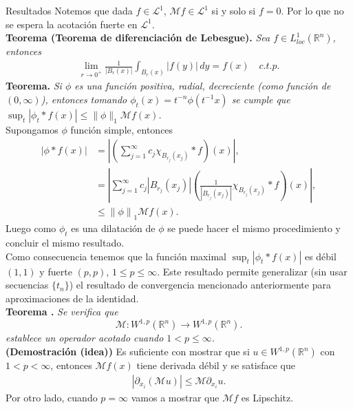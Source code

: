 \documentclass[final]{beamer}
\providecommand{\norm}[1]{\left\|#1\right\|}
\newlength{\colwidth}
\begin{document}
\begin{frame}[t]
\begin{columns}[t]
\begin{column}{\colwidth}
\begin{alertblock}{Resultados}
      \vspace{0.2cm}
      Notemos que dada $f\in \mathcal{L}^1$, $\mathcal{M}f \in \mathcal{L}^1$ si y solo si $f=0$. Por lo que no se espera la acotación fuerte en $\mathcal{L}^1$.\\
      \vspace{0.2cm}
    \textbf{Teorema (Teorema de diferenciación de Lebesgue).} \emph{Sea $f\in L^{1}_{loc}(\mathbb{R}^{n})$, entonces
      \begin{align*}
        \lim_{r \to 0^{+}}\frac{1}{|B_{r}(x)|}\int_{B_{r}(x)}|f(y)|\, dy=f(x)\quad c.t.p.
      \end{align*}}
      \vspace{0.2cm}
    \textbf{Teorema.} \emph{Si $\phi$ es una función positiva, radial, decreciente (como función de $(0,\infty)$), entonces tomando $\phi_{t}(x)=t^{-n}\phi(t^{-1}x)$ se cumple que $\sup_{t}|\phi_t\ast f(x)|\leq \|\phi\|_1\mathcal{M}f(x)$.}\\
      Supongamos $\phi$ función simple, entonces
      \begin{align*}
        \left|\phi*f(x)\right|&=\left|\left(\sum_{j=1}^{\infty}c_j\chi_{B_{r_j}(x_j)}*f\right)(x)\right|,\\
        &=\left|\sum_{j=1}^{\infty}c_{j}|B_{r_j}(x_j)|\left( \frac{1}{|B_{r_{j}}(x_j)|}\chi_{B_{r_j}(x_j)}*f \right)(x)\right|,\\
        &\leq\norm{\phi}_{1}\mathcal{M}f(x).
      \end{align*}
      Luego como $\phi_{t}$ es una dilatación de $\phi$ se puede hacer el mismo procedimiento y concluir el mismo resultado.\\
      \vspace{0.2cm}
      Como consecuencia tenemos que la función maximal $\sup_{t}|\phi_t\ast f(x)|$ es débil $(1,1)$ y fuerte $(p,p)$, $1\leq p \leq \infty$.
      Este resultado permite generalizar (sin usar secuencias $\{t_n\}$) el resultado de convergencia mencionado anteriormente para aproximaciones de la identidad.\\ 
    \textbf{Teorema \cite{MR1469106}.} \emph{Se verifica  que
      \begin{equation*}
          \mathcal{M}:W^{1,p}(\mathbb{R}^n)\rightarrow W^{1,p}(\mathbb{R}^n). 
      \end{equation*}
      establece un operador acotado cuando $1<p\leq \infty$.}\\
      \vspace{0.2cm}
      \textbf{(Demostración (idea))} Es suficiente con mostrar que si $u\in W^{1,p}(\mathbb{R}^{n})$ con $1<p< \infty$, entonces $\mathcal{M}f(x)$ tiene derivada débil y se satisface que
      \begin{align*}
        |\partial_{x_i}(\mathcal{M}u)|\leq \mathcal{M}\partial_{x_i}u.
      \end{align*}
      Por otro lado, cuando $p=\infty$ vamos a mostrar que $\mathcal{M}f$ es Lipschitz. 
  \end{alertblock}
\end{column}


\end{columns}
\end{frame}
\end{document}
